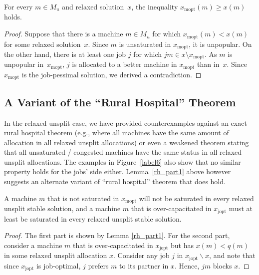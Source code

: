\documentclass{llncs}
\begin{document}
\begin{lemma}
\label{rh_part1}
 For every $m \in M_u$ and relaxed solution~$x$, the inequality
 $x_{\text{mopt}}(m) \geq x(m)$ holds.
\end{lemma}
	
\begin{proof}
Suppose that there is a machine $m \in M_u$ for which
$x_{\text{mopt}}(m) < x(m)$ for some relaxed solution~$x$. Since $m$
is unsaturated in $x_{\text{mopt}}$, it is unpopular. On the other
hand, there is at least one job $j$ for which $jm \in x \setminus
x_{\text{mopt}}$. As $m$ is unpopular in~$x_{\text{mopt}}$, $j$ is
allocated to a better machine in $x_{\text{mopt}}$ than in~$x$. Since
$x_{\text{mopt}}$ is the job-pessimal solution, we derived a
contradiction.
\end{proof}

\subsection{A Variant of the ``Rural Hospital'' Theorem}
\label{rural_hospital}
In the relaxed unsplit case, we have provided counterexamples against
an exact rural hospital theorem (e.g., where all machines have the
same amount of allocation in all relaxed unsplit allocations) or even
a weakened theorem stating that all unsaturated / congested machines
have the same status in all relaxed unsplit allocations. The examples in Figure~\ref{label6} also show that no similar property holds for the jobs' side either. Lemma~\ref{rh_part1} above however suggests an alternate variant of ``rural
hospital'' theorem that does hold.

\begin{theorem}
A machine $m$ that is not saturated in $x_{\text{mopt}}$ will not be
saturated in every relaxed unsplit stable solution, and a machine $m$
that is over-capacitated in $x_{\text{jopt}}$ must at least be
saturated in every relaxed unsplit stable solution.
\end{theorem}

\begin{proof}
The first part is shown by Lemma \ref{rh_part1}.  For the second part,
consider a machine $m$ that is over-capacitated in $x_{\text{jopt}}$
but has $x(m) < q(m)$ in some relaxed unsplit allocation $x$.
Consider any job $j$ in $x_{\text{jopt}} \backslash x$, and note that
since $x_{\text{jopt}}$ is job-optimal, $j$ prefers $m$ to its partner
in $x$.  Hence, $jm$ blocks $x$.
\end{proof}
\end{document}
